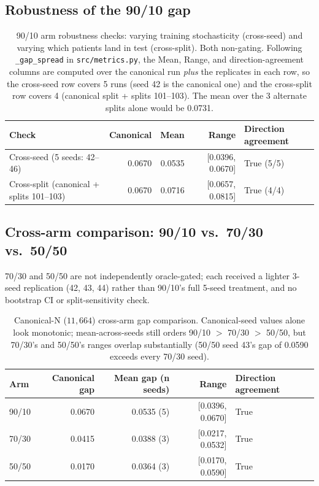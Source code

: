 \documentclass[11pt]{article}
\begin{document}
\subsection{Robustness of the 90/10 gap}

\begin{table}[H]
\centering
\begin{tabular}{lrrrl}
\toprule
Check & Canonical & Mean & Range & Direction agreement \\
\midrule
Cross-seed (5 seeds: 42--46) & 0.0670 & 0.0535 & [0.0396, 0.0670] & True (5/5) \\
Cross-split (canonical + splits 101--103) & 0.0670 & 0.0716 & [0.0657, 0.0815] & True (4/4) \\
\bottomrule
\end{tabular}
\caption{90/10 arm robustness checks: varying training stochasticity (cross-seed) and varying which patients land in test (cross-split). Both non-gating. Following \texttt{\_gap\_spread} in \texttt{src/metrics.py}, the Mean, Range, and direction-agreement columns are computed over the canonical run \emph{plus} the replicates in each row, so the cross-seed row covers 5 runs (seed 42 is the canonical one) and the cross-split row covers 4 (canonical split + splits 101--103). The mean over the 3 alternate splits alone would be 0.0731.}
\label{tab:robustness}
\end{table}

\subsection{Cross-arm comparison: 90/10 vs.\ 70/30 vs.\ 50/50}

70/30 and 50/50 are not independently oracle-gated; each received a lighter 3-seed replication (42, 43, 44) rather than 90/10's full 5-seed treatment, and no bootstrap CI or split-sensitivity check.

\begin{table}[H]
\centering
\begin{tabular}{lrrrl}
\toprule
Arm & Canonical gap & Mean gap (n seeds) & Range & Direction agreement \\
\midrule
90/10 & 0.0670 & 0.0535 (5) & [0.0396, 0.0670] & True \\
70/30 & 0.0415 & 0.0388 (3) & [0.0217, 0.0532] & True \\
50/50 & 0.0170 & 0.0364 (3) & [0.0170, 0.0590] & True \\
\bottomrule
\end{tabular}
\caption{Canonical-N ($11{,}664$) cross-arm gap comparison. Canonical-seed values alone look monotonic; mean-across-seeds still orders 90/10 $>$ 70/30 $>$ 50/50, but 70/30's and 50/50's ranges overlap substantially (50/50 seed 43's gap of 0.0590 exceeds every 70/30 seed).}
\label{tab:crossarm}
\end{table}
\end{document}
